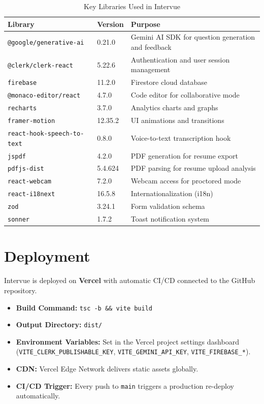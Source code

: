 \begin{table}[h!]
\centering
\caption{Key Libraries Used in Intervue}
\begin{tabular}{|p{4cm}|p{3cm}|p{5cm}|}
\hline
\textbf{Library} & \textbf{Version} & \textbf{Purpose} \\
\hline
\texttt{@google/generative-ai} & 0.21.0 & Gemini AI SDK for question generation and feedback \\
\hline
\texttt{@clerk/clerk-react} & 5.22.6 & Authentication and user session management \\
\hline
\texttt{firebase} & 11.2.0 & Firestore cloud database \\
\hline
\texttt{@monaco-editor/react} & 4.7.0 & Code editor for collaborative mode \\
\hline
\texttt{recharts} & 3.7.0 & Analytics charts and graphs \\
\hline
\texttt{framer-motion} & 12.35.2 & UI animations and transitions \\
\hline
\texttt{react-hook-speech-to-text} & 0.8.0 & Voice-to-text transcription hook \\
\hline
\texttt{jspdf} & 4.2.0 & PDF generation for resume export \\
\hline
\texttt{pdfjs-dist} & 5.4.624 & PDF parsing for resume upload analysis \\
\hline
\texttt{react-webcam} & 7.2.0 & Webcam access for proctored mode \\
\hline
\texttt{react-i18next} & 16.5.8 & Internationalization (i18n) \\
\hline
\texttt{zod} & 3.24.1 & Form validation schema \\
\hline
\texttt{sonner} & 1.7.2 & Toast notification system \\
\hline
\end{tabular}
\end{table}

\section{Deployment}
Intervue is deployed on \textbf{Vercel} with automatic CI/CD connected to the GitHub repository.

\begin{itemize}
	\item \textbf{Build Command:} \texttt{tsc -b \&\& vite build}
	\item \textbf{Output Directory:} \texttt{dist/}
	\item \textbf{Environment Variables:} Set in the Vercel project settings dashboard (\texttt{VITE\_CLERK\_PUBLISHABLE\_KEY}, \texttt{VITE\_GEMINI\_API\_KEY}, \texttt{VITE\_FIREBASE\_*}).
	\item \textbf{CDN:} Vercel Edge Network delivers static assets globally.
	\item \textbf{CI/CD Trigger:} Every push to \texttt{main} triggers a production re-deploy automatically.
\end{itemize}

